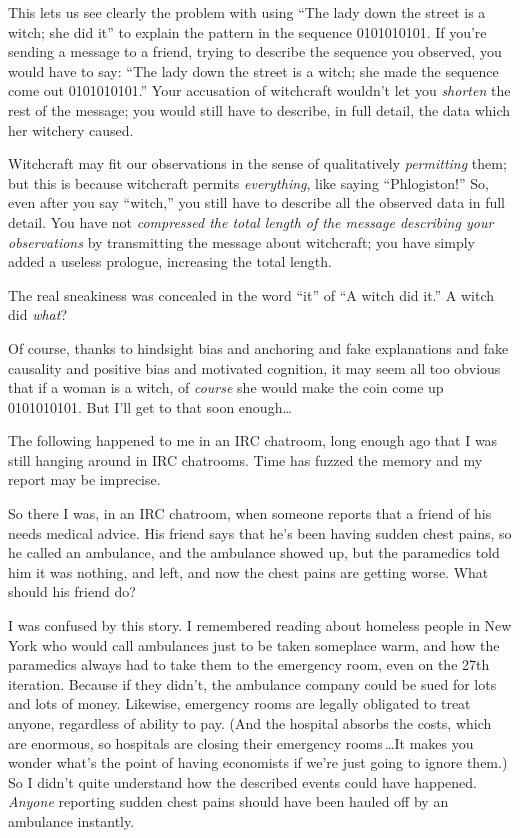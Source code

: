 {
 This lets us see clearly the problem with using
``The lady down the street is a witch; she did
it'' to explain the pattern in the sequence
0101010101. If you're sending a message to a friend,
trying to describe the sequence you observed, you would have to say:
``The lady down the street is a witch; she made the
sequence come out 0101010101.'' Your accusation of
witchcraft wouldn't let you \textit{shorten} the rest
of the message; you would still have to describe, in full detail, the
data which her witchery caused.}

{
 Witchcraft may fit our observations in the sense of qualitatively
\textit{permitting} them; but this is because witchcraft permits
\textit{everything}, like saying
``Phlogiston!'' So, even after you
say ``witch,'' you still have to
describe all the observed data in full detail. You have not
\textit{compressed the total length of the message describing your
observations} by transmitting the message about witchcraft; you have
simply added a useless prologue, increasing the total length.}

{
 The real sneakiness was concealed in the word
``it'' of ``A witch
did it.'' A witch did \textit{what}?}

{
 Of course, thanks to hindsight bias and anchoring and fake
explanations and fake causality and positive bias and motivated
cognition, it may seem all too obvious that if a woman is a witch, of
\textit{course} she would make the coin come up 0101010101. But
I'll get to that soon enough\ldots}

\myendsectiontext


{
 The following happened to me in an IRC chatroom, long enough ago
that I was still hanging around in IRC chatrooms. Time has fuzzed the
memory and my report may be imprecise. }

{
 So there I was, in an IRC chatroom, when someone reports that a
friend of his needs medical advice. His friend says that
he's been having sudden chest pains, so he called an
ambulance, and the ambulance showed up, but the paramedics told him it
was nothing, and left, and now the chest pains are getting worse. What
should his friend do?}

{
 I was confused by this story. I remembered reading about homeless
people in New York who would call ambulances just to be taken someplace
warm, and how the paramedics always had to take them to the emergency
room, even on the 27th iteration. Because if they
didn't, the ambulance company could be sued for lots
and lots of money. Likewise, emergency rooms are legally obligated to
treat anyone, regardless of ability to pay. (And the hospital absorbs
the costs, which are enormous, so hospitals are closing their emergency
rooms\,\ldots It makes you wonder what's the point of
having economists if we're just going to ignore them.)
So I didn't quite understand how the described events
could have happened. \textit{Anyone} reporting sudden chest pains
should have been hauled off by an ambulance instantly.}


